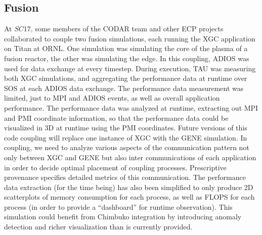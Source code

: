 \subsection{Fusion}
At $SC17$, some members of the CODAR team and other ECP projects collaborated to couple two fusion simulations, each running the XGC application on Titan at ORNL.  One simulation was simulating the core of the plasma of a fusion reactor, the other was simulating the edge. In this coupling, ADIOS was used for data exchange at every timestep.  During execution, TAU was measuring both XGC simulations, and aggregating the performance data at runtime over SOS at each ADIOS data exchange. The performance data measurement was limited, just to MPI and ADIOS events, as well as overall application performance.  The performance data was analyzed at runtime, extracting out MPI and PMI coordinate information, so that the performance data could be visualized in 3D at runtime using the PMI coordinates.  Future versions of this code coupling will replace one instance of XGC with the GENE simulation.  
In coupling, we need to analyze various aspects of the communication pattern not only between XGC and GENE but also inter communications of each application in order to decide optimal placement of coupling processes.  Prescriptive provenance specifies detailed metrics of this communication. 
The performance data extraction (for the time being) has also been simplified to only produce 2D scatterplots of memory consumption for each process, as well as FLOPS for each process (in order to provide a ``dashboard'' for runtime observation).  This simulation could benefit from Chimbuko integration by introducing anomaly detection and richer visualization than is currently provided. 
